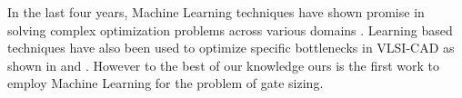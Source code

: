 \noindent In the last four years, Machine Learning techniques have shown promise in solving complex optimization problems across various domains \cite{prowatch}. Learning based techniques have also been used to optimize specific bottlenecks in VLSI-CAD as shown in \cite{kahng:2} and \cite{kahng:3}. However to the best of our knowledge ours is the first work to employ Machine Learning for the problem of gate sizing.






%
%
%



